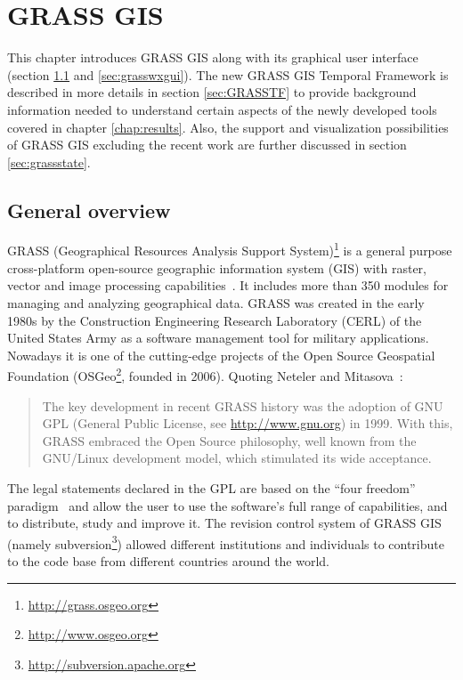 \documentclass[a4paper,12pt,oneside]{book}
\newcommand{\tf}{Temporal Framework\xspace}
\begin{document}
\chapter{GRASS GIS}
\label{chap:grass}

This chapter introduces GRASS GIS along with its graphical user interface
(section \ref{sec:grassoverview} and \ref{sec:grasswxgui}).
The new GRASS GIS \tf is described in more details in section \ref{sec:GRASSTF}
to provide background information needed
to understand certain aspects of the newly developed tools covered in chapter \ref{chap:results}.
Also, the support and visualization possibilities of GRASS GIS excluding
the recent work are further discussed in section \ref{sec:grassstate}.

\section{General overview}
\label{sec:grassoverview}
GRASS  (Geographical Resources Analysis Support System)\footnote{\url{http://grass.osgeo.org}}
is a general purpose cross-platform open-source geographic information system (GIS)
with raster, vector and image processing capabilities~\cite{neteler2011grass}.
It includes more than 350 modules for managing and analyzing geographical data.
GRASS was created in the early 1980s by the Construction Engineering Research Laboratory (CERL)
of the United States Army as a software management tool for military applications.
Nowadays it is one of the cutting-edge projects of the Open Source Geospatial Foundation
(OSGeo\footnote{\url{http://www.osgeo.org}}, founded in 2006).
Quoting Neteler and Mitasova~\cite[p.~3]{grassGisApproach}:

\begin{quote}
The key development in recent GRASS history was the adoption of GNU GPL
(General Public License, see \url{http://www.gnu.org}) in 1999.
With this, GRASS embraced the Open Source philosophy,
well known from the GNU/Linux development model, which stimulated its wide acceptance.
\end{quote}

The legal statements declared in the GPL are based on the ``four freedom'' paradigm~\cite{stallman1985gnu}
and allow the user to use the software’s full range of capabilities, and to distribute, study and improve it.
The revision control system of GRASS GIS (namely subversion\footnote{\url{http://subversion.apache.org}})
allowed different institutions and individuals to contribute to the code base
from different countries around the world.
\end{document}
